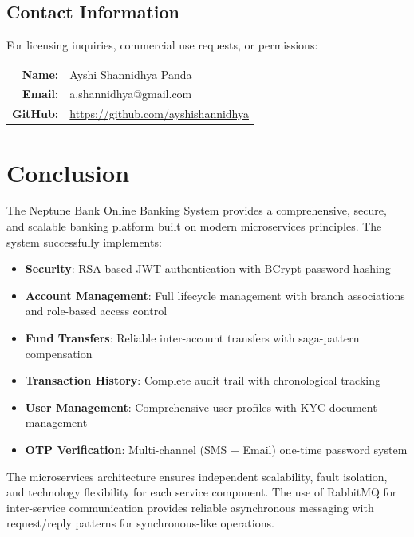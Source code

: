 \documentclass[12pt,a4paper]{report}
\begin{document}
\section{Contact Information}
For licensing inquiries, commercial use requests, or permissions:

\begin{table}[H]
\centering
\begin{tabular}{rl}
\textbf{Name:} & Ayshi Shannidhya Panda \\
\textbf{Email:} & a.shannidhya@gmail.com \\
\textbf{GitHub:} & \url{https://github.com/ayshishannidhya} \\
\end{tabular}
\end{table}

\chapter{Conclusion}
The Neptune Bank Online Banking System provides a comprehensive, secure, and scalable banking platform built on modern microservices principles. The system successfully implements:

\begin{itemize}[leftmargin=*]
    \item \textbf{Security}: RSA-based JWT authentication with BCrypt password hashing
    \item \textbf{Account Management}: Full lifecycle management with branch associations and role-based access control
    \item \textbf{Fund Transfers}: Reliable inter-account transfers with saga-pattern compensation
    \item \textbf{Transaction History}: Complete audit trail with chronological tracking
    \item \textbf{User Management}: Comprehensive user profiles with KYC document management
    \item \textbf{OTP Verification}: Multi-channel (SMS + Email) one-time password system
\end{itemize}

The microservices architecture ensures independent scalability, fault isolation, and technology flexibility for each service component. The use of RabbitMQ for inter-service communication provides reliable asynchronous messaging with request/reply patterns for synchronous-like operations.
\end{document}
